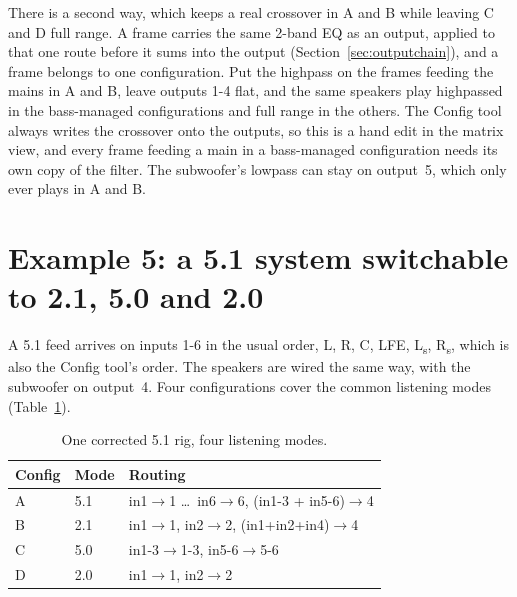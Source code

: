 There is a second way, which keeps a real crossover in A and B while leaving C and D full range. A frame carries the same 2-band EQ as an output, applied to that one route before it sums into the output (Section~\ref{sec:outputchain}), and a frame belongs to one configuration. Put the highpass on the frames feeding the mains in A and B, leave outputs 1-4 flat, and the same speakers play highpassed in the bass-managed configurations and full range in the others. The Config tool always writes the crossover onto the outputs, so this is a hand edit in the matrix view, and every frame feeding a main in a bass-managed configuration needs its own copy of the filter. The subwoofer's lowpass can stay on output~5, which only ever plays in A and B.

\section{Example 5: a 5.1 system switchable to 2.1, 5.0 and 2.0}\label{sec:ex-surround}

A 5.1 feed arrives on inputs 1-6 in the usual order, L, R, C, LFE, L\textsubscript{s}, R\textsubscript{s}, which is also the Config tool's order. The speakers are wired the same way, with the subwoofer on output~4. Four configurations cover the common listening modes (Table~\ref{tab:ex-surround}).

\begin{table}[h]\centering
\begin{tabular}{lll}
\toprule
Config & Mode & Routing \\
\midrule
A & 5.1 & in1$\rightarrow$1 \dots\ in6$\rightarrow$6,\; (in1-3 + in5-6)$\rightarrow$4 \\
B & 2.1 & in1$\rightarrow$1,\; in2$\rightarrow$2,\; (in1+in2+in4)$\rightarrow$4 \\
C & 5.0 & in1-3$\rightarrow$1-3,\; in5-6$\rightarrow$5-6 \\
D & 2.0 & in1$\rightarrow$1,\; in2$\rightarrow$2 \\
\bottomrule
\end{tabular}
\caption{One corrected 5.1 rig, four listening modes.}\label{tab:ex-surround}
\end{table}

